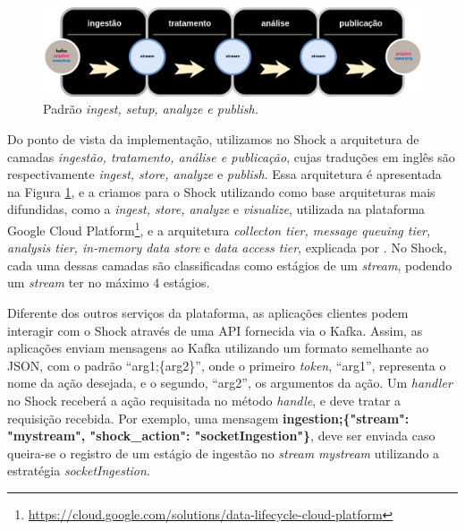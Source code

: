 \begin{figure}[hbt]
  \centering
  \includegraphics[scale=0.35]{figuras/arquiteturaforensic.png}
  \caption{Padrão \textit{ingest, setup, analyze e publish.}}
  \label{fig:ingeststore}
\end{figure}

Do ponto de vista da implementação, utilizamos no Shock a arquitetura de camadas
\textit{ingestão, tratamento, análise e publicação}, cujas traduções em inglês são
respectivamente \textit{ingest, store, analyze} e \textit{publish}. Essa arquitetura
é apresentada na Figura \ref{fig:ingeststore}, e a criamos para o Shock utilizando
como base arquiteturas mais difundidas, como a \textit{ingest, store, analyze} e
\textit{visualize}, utilizada na plataforma Google Cloud
Platform\footnote{\url{https://cloud.google.com/solutions/data-lifecycle-cloud-platform}},
e a arquitetura \textit{collecton tier, message queuing tier, analysis tier,
in-memory data store} e \textit{data access tier}, explicada por
. No Shock, cada uma dessas camadas são
classificadas como estágios de um \textit{stream}, podendo um
\textit{stream} ter no máximo 4 estágios.

Diferente dos outros serviços da plataforma, as aplicações clientes podem interagir
com o Shock através de uma API fornecida via o Kafka. Assim, as aplicações enviam
mensagens ao Kafka utilizando um formato semelhante ao JSON, com o padrão ``arg1;\{arg2\}'',
onde o primeiro \textit{token}, ``arg1'', representa o nome
da ação desejada, e o segundo, ``arg2'', os argumentos da ação. Um
\textit{handler} no Shock receberá a ação requisitada no método
\textit{handle}, e deve tratar a requisição recebida. Por exemplo, uma mensagem
\small{\textbf{ingestion;\{"stream": "mystream", "shock\_action": "socketIngestion"\}}},
deve ser enviada caso queira-se o registro de um estágio de ingestão no
\textit{stream} \textit{mystream} utilizando a estratégia \textit{socketIngestion}.

